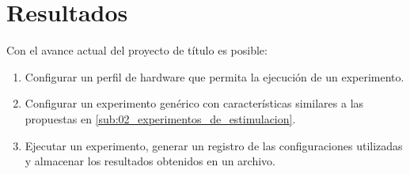 \documentclass[\main/main.tex]{subfiles}
\begin{document}
\chapter{Resultados}
\label{cha:04_resultados}
	Con el avance actual del proyecto de título es posible:
	\begin{enumerate}\setlength\itemsep{-0.2em}
		\item Configurar un perfil de hardware que permita la ejecución de un experimento. 

		\item Configurar un experimento genérico con características similares a las propuestas en \ref{sub:02_experimentos_de_estimulacion}. 

		\item Ejecutar un experimento, generar un registro de las configuraciones utilizadas y almacenar los resultados obtenidos en un archivo.  

	\end{enumerate}
\end{document}
